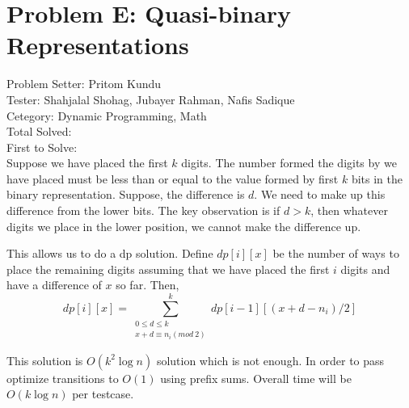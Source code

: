 \section*{Problem E: Quasi-binary Representations}
Problem Setter: Pritom Kundu \\
Tester: Shahjalal Shohag, Jubayer Rahman, Nafis Sadique \\
Cetegory: Dynamic Programming, Math \\
Total Solved:  \\
First to Solve: \\

Suppose we have placed the first $k$ digits. The number formed the digits by we have placed must be less than or equal to the value formed by first $k$ bits in the binary representation. Suppose, the difference is $d$. We need to make up this difference from the lower bits. The key observation is if $d > k$, then whatever digits we place in the lower position, we cannot make the difference up.

This allows us to do a dp solution. Define $dp[i][x]$ be the number of ways to place the remaining digits assuming that we have placed the first $i$ digits and have a difference of $x$ so far. Then, 
$$dp[i][x] = \sum_{\substack{0 \leq d \leq k \\ x+d \equiv n_i (mod\ 2)}}^{k}dp[i-1][(x+d-n_i)/2]$$

This solution is $O(k^2 \log n ) $ solution which is not enough. In order to pass optimize transitions to $O(1)$ using prefix sums. Overall time will be $O(k \log n)$ per testcase.
